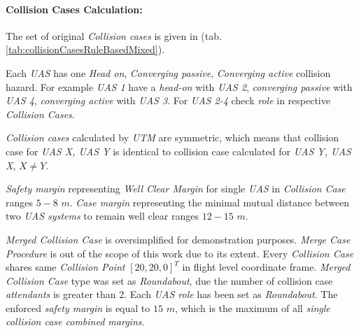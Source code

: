 \paragraph{Collision Cases Calculation:} The set of original \emph{Collision cases} is given in (tab. \ref{tab:collisionCasesRuleBasedMixed}). 

Each \emph{UAS} has one \emph{Head on}, \emph{Converging passive}, \emph{Converging active} collision hazard. For example \emph{UAS 1} have a \emph{head-on} with  \emph{UAS 2}, \emph{converging passive} with \emph{UAS 4}, \emph{converging active} with \emph{UAS 3}. For \emph{UAS 2-4} check \emph{role} in respective \emph{Collision Cases}.

\begin{note} \emph{Collision cases} calculated by \emph{UTM} are symmetric, which means that collision case for \emph{UAS X, UAS Y} is identical to collision case calculated for \emph{UAS Y, UAS X}, $X \neq Y$.
\end{note}

\emph{Safety margin} representing \emph{Well Clear Margin} for single \emph{UAS} in \emph{Collision Case} ranges $5-8$ $m$. \emph{Case margin} representing the minimal mutual distance between two \emph{UAS systems} to remain well clear ranges $12-15$ $m$.

\emph{Merged Collision Case} is oversimplified for demonstration purposes. \emph{Merge Case Procedure} is out of the scope of this work due to its extent. Every \emph{Collision Case} shares same \emph{Collision Point} $[20,20,0]^T$ in flight level coordinate frame. \emph{Merged Collision Case} type was set as \emph{Roundabout}, due the number of collision case \emph{attendants} is greater than 2. Each \emph{UAS role} has been set as \emph{Roundabout}. The enforced \emph{safety margin} is equal to $15$ $m$, which is the maximum of all \emph{single collision case combined margins}.

